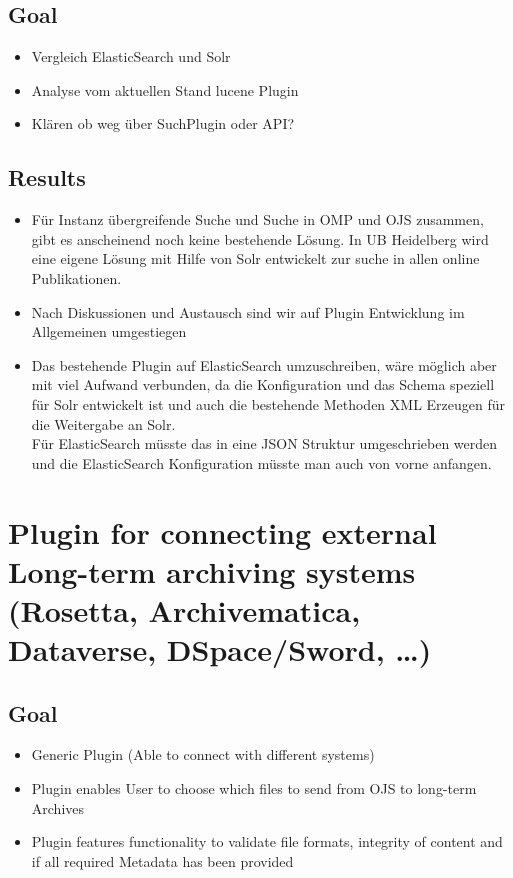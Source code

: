 \documentclass{article}
\begin{document}
\subsection[{Goal}]{\label{309dd9qucqop}Goal}
\begin{itemize}
\item Vergleich ElasticSearch und Solr
\item Analyse vom aktuellen Stand lucene Plugin
\item Klären ob weg über SuchPlugin oder API?
\end{itemize} 
\subsection[{Results}]{\label{6b7urgumedb2}Results}
\begin{itemize}
\item Für Instanz übergreifende Suche und Suche in OMP und OJS zusammen, gibt es anscheinend noch keine bestehende Lösung. In UB Heidelberg wird eine eigene Lösung mit Hilfe von Solr entwickelt zur suche in allen online Publikationen.
\item Nach Diskussionen und Austausch sind wir auf Plugin Entwicklung im Allgemeinen umgestiegen
\item Das bestehende Plugin auf ElasticSearch umzuschreiben, wäre möglich aber mit viel Aufwand verbunden, da die Konfiguration und das Schema speziell für Solr entwickelt ist und auch die bestehende Methoden XML Erzeugen für die Weitergabe an Solr.{\hskip1pt}\\{}Für ElasticSearch müsste das in eine JSON Struktur umgeschrieben werden und die ElasticSearch Konfiguration müsste man auch von vorne anfangen.
\end{itemize} 
\section{Plugin for connecting external Long-term archiving systems (Rosetta, Archivematica, Dataverse, DSpace/Sword, …)}

\author{Gerhard Eilbacher, Ronny Bölter, Martin Brändle, Paul Warner}

\subsection[{Goal}]{\label{13mtyhwidjmu}Goal}

\begin{itemize}
\item Generic Plugin (Able to connect with different systems) 
\item Plugin enables User to choose which files to send from OJS to long-term Archives
\item Plugin features functionality to validate file formats, integrity of content and if all required Metadata has been provided
\end{itemize} 
\end{document}
